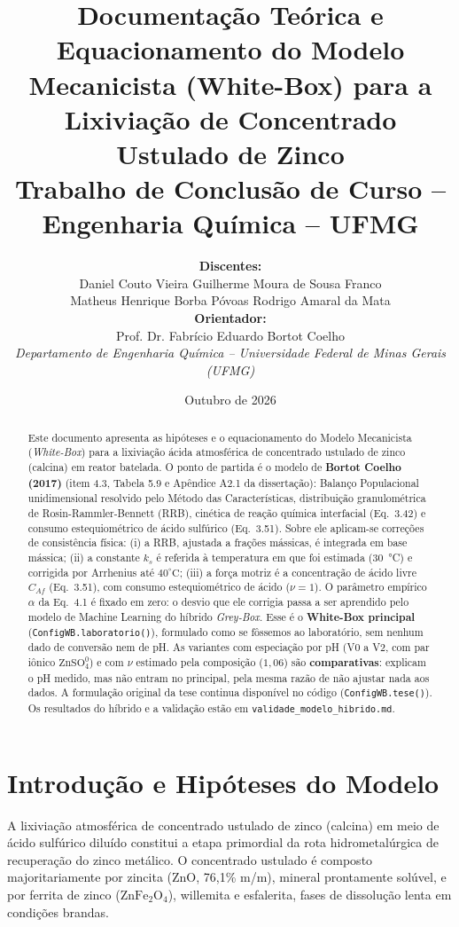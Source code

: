 \documentclass[12pt,a4paper]{article}
\title{\textbf{Documentação Teórica e Equacionamento do Modelo Mecanicista (White-Box) para a Lixiviação de Concentrado Ustulado de Zinco}\\[0.5em]
\large Trabalho de Conclusão de Curso -- Engenharia Química -- UFMG}
\author{
    \textbf{Discentes:}\\
    Daniel Couto Vieira \quad Guilherme Moura de Sousa Franco\\
    Matheus Henrique Borba Póvoas \quad Rodrigo Amaral da Mata\\[1em]
    \textbf{Orientador:}\\
    Prof. Dr. Fabrício Eduardo Bortot Coelho\\[0.5em]
    \textit{Departamento de Engenharia Química -- Universidade Federal de Minas Gerais (UFMG)}
}
\date{Outubro de 2026}
\begin{document}
\maketitle

\begin{abstract}
Este documento apresenta as hipóteses e o equacionamento do Modelo Mecanicista (\textit{White-Box}) para a lixiviação ácida atmosférica de concentrado ustulado de zinco (calcina) em reator batelada. O ponto de partida é o modelo de \textbf{Bortot Coelho (2017)} (item 4.3, Tabela 5.9 e Apêndice A2.1 da dissertação): Balanço Populacional unidimensional resolvido pelo Método das Características, distribuição granulométrica de Rosin-Rammler-Bennett (RRB), cinética de reação química interfacial (Eq.~3.42) e consumo estequiométrico de ácido sulfúrico (Eq.~3.51). Sobre ele aplicam-se correções de consistência física: (i) a RRB, ajustada a frações mássicas, é integrada em base mássica; (ii) a constante $k_s$ é referida à temperatura em que foi estimada (30~°C) e corrigida por Arrhenius até $40^\circ\text{C}$; (iii) a força motriz é a concentração de ácido livre $C_{Af}$ (Eq.~3.51), com consumo estequiométrico de ácido ($\nu = 1$). O parâmetro empírico $\alpha$ da Eq.~4.1 é fixado em zero: o desvio que ele corrigia passa a ser aprendido pelo modelo de Machine Learning do híbrido \textit{Grey-Box}. Esse é o \textbf{White-Box principal} (\texttt{ConfigWB.laboratorio()}), formulado como se fôssemos ao laboratório, sem nenhum dado de conversão nem de pH. As variantes com especiação por pH (V0 a V2, com par iônico $\text{ZnSO}_4^0$) e com $\nu$ estimado pela composição ($1{,}06$) são \textbf{comparativas}: explicam o pH medido, mas não entram no principal, pela mesma razão de não ajustar nada aos dados. A formulação original da tese continua disponível no código (\texttt{ConfigWB.tese()}). Os resultados do híbrido e a validação estão em \texttt{validade\_modelo\_hibrido.md}.
\end{abstract}

\tableofcontents
\newpage

\section{Introdução e Hipóteses do Modelo}

A lixiviação atmosférica de concentrado ustulado de zinco (calcina) em meio de ácido sulfúrico diluído constitui a etapa primordial da rota hidrometalúrgica de recuperação do zinco metálico. O concentrado ustulado é composto majoritariamente por zincita ($\text{ZnO}$, 76,1\% m/m), mineral prontamente solúvel, e por ferrita de zinco ($\text{ZnFe}_2\text{O}_4$), willemita e esfalerita, fases de dissolução lenta em condições brandas.
\end{document}

